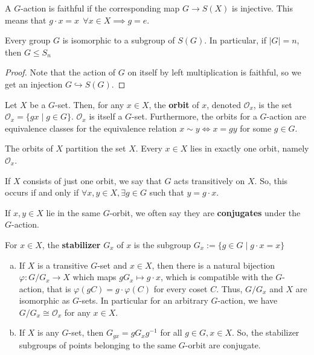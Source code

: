 \begin{defn}
    A $G$-action is faithful if the corresponding map $G \to S(X)$ is injective. This means that $g\cdot x =x\:\: \forall x \in X \implies g=e$.
\end{defn}

\begin{thm}
    Every group $G$ is isomorphic to a subgroup of $S(G)$. In particular, if $|G| = n$, then $G \leq S_n$
\end{thm}

\begin{proof}
    Note that the action of $G$ on itself by left multiplication is faithful, so we get an injection $G \hookrightarrow S(G)$.
\end{proof}

\begin{defn}
    Let $X$ be a $G$-set. Then, for any $x \in X$, the \textbf{orbit} of $x$, denoted $\mathcal O_x$, is the set $\mathcal O_x=\{gx \mid g \in G\}$. $\mathcal O_x$ is itself a $G$-set. Furthermore, the orbits for a $G$-action are equivalence classes for the equivalence relation $x \sim y \iff x=gy$ for some $g \in G$.
\end{defn}

\begin{prop}
    The orbits of $X$ partition the set $X$. Every $x \in X$ lies in exactly one orbit, namely $\mathcal O_x$.
\end{prop}

\begin{defn}
    If $X$ consists of just one orbit, we say that $G$ acts transitively on $X$. So, this occurs if and only if $\forall x,y \in X,\exists g\in G$ such that $y=g \cdot x$.
\end{defn}

\begin{defn}
    If $x,y \in X$ lie in the same $G$-orbit, we often say they are \textbf{conjugates} under the $G$-action.
\end{defn}

\begin{defn}
    For $x \in X$, the \textbf{stabilizer} $G_x$ of $x$ is the subgroup $G_x := \{ g \in G\mid g \cdot x = x\}$
\end{defn}

\begin{thm}
    \begin{enumerate}[(a)]
        \item If $X$ is a transitive $G$-set and $x \in X$, then there is a natural bijection $\varphi:G/G_x \to X$ which maps $gG_x \mapsto g\cdot x$, which is compatible with the $G$-action, that is $\varphi (gC)=g \cdot \varphi(C)$ for every coset $C$. Thus, $G/G_x$ and $X$ are isomorphic as $G$-sets. In particular for an arbitrary $G$-action, we have $G/G_x \cong \mathcal O_x$ for any $x \in X$.
        \item If $X$ is any $G$-set, then $G_{gx}=gG_xg^{-1}$ for all $g\in G,x\in X$. So, the stabilizer subgroups of points belonging to the same $G$-orbit are conjugate.
    \end{enumerate}
\end{thm}

